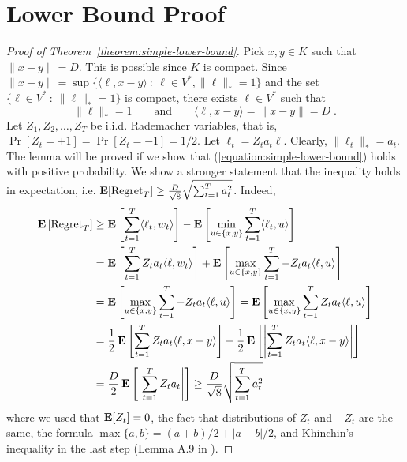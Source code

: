 \section{Lower Bound Proof}
\label{section:lower-bound-proof}

\begin{proof}[Proof of Theorem~\ref{theorem:simple-lower-bound}]
Pick $x,y \in K$ such that $\|x - y\| = D$. This is possible since $K$ is compact.
Since $\|x - y\| = \sup \{\langle \ell, x - y \rangle ~:~ \ell \in V^*, \|\ell\|_* = 1\}$
and the set $\{ \ell \in V^* ~:~ \|\ell\|_* = 1 \}$ is compact, there exists $\ell \in V^*$
such that
$$
\|\ell\|_* = 1 \qquad \text{and} \qquad \langle \ell, x - y \rangle = \|x - y\| = D \; .
$$
Let $Z_1, Z_2, \dots, Z_T$ be i.i.d. Rademacher variables, that is,
$\Pr[Z_t = +1] = \Pr[Z_t = -1] = 1/2$. Let $\ell_t = Z_t a_t \ell$.
Clearly, $\|\ell_t\|_* = a_t$. The lemma will be proved if we show that
(\ref{equation:simple-lower-bound}) holds with positive probability.
We show a stronger statement that the inequality holds in expectation, i.e.
$\operatorname*{\mathbf{E}}[\operatorname{Regret}_T] \ge \frac{D}{\sqrt{8}} \sqrt{\sum_{t=1}^T a_t^2}$. Indeed,
\begin{align*}
\operatorname*{\mathbf{E}}\left[ \operatorname{Regret}_T \right]
& \ge \operatorname*{\mathbf{E}}\left[ \sum_{t=1}^T \langle \ell_t, w_t \rangle \right] - \operatorname*{\mathbf{E}}\left[\min_{u \in \{x,y\}} \sum_{t=1}^T \langle \ell_t, u \rangle \right] \\
& = \operatorname*{\mathbf{E}}\left[ \sum_{t=1}^T Z_t a_t \langle \ell, w_t \rangle \right] + \operatorname*{\mathbf{E}} \left[\max_{u \in \{x,y\}} \sum_{t=1}^T -Z_t a_t \langle \ell, u \rangle \right]  \\
& = \operatorname*{\mathbf{E}}\left[ \max_{u \in \{x,y\}} \sum_{t=1}^T -Z_t a_t \langle \ell, u \rangle \right] = \operatorname*{\mathbf{E}}\left[ \max_{u \in \{x,y\}} \sum_{t=1}^T Z_t a_t \langle \ell, u \rangle \right]  \\
& = \frac{1}{2} \operatorname*{\mathbf{E}}\left[ \sum_{t=1}^T Z_t a_t \langle \ell, x + y \rangle \right]  + \frac{1}{2}\operatorname*{\mathbf{E}}\left[ \left|\sum_{t=1}^T Z_t a_t \langle \ell, x - y \rangle \right| \right] \\
& = \frac{D}{2}\operatorname*{\mathbf{E}}\left[ \left|\sum_{t=1}^T Z_t a_t \right| \right] \ge \frac{D}{\sqrt{8}} \sqrt{\sum_{t=1}^T a_t^2}
\end{align*}
where we used that $\operatorname*{\mathbf{E}}[Z_t] = 0$, the fact that distributions of $Z_t$ and
$-Z_t$ are the same, the formula $\max\{a,b\} = (a+b)/2 + |a-b|/2$, and
Khinchin's inequality in the last step (Lemma A.9 in
\cite{Cesa-Bianchi-Lugosi-2006}).
\end{proof}
